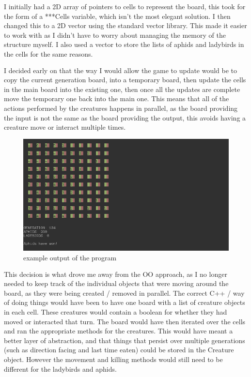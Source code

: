 \documentclass[10pt]{article}
\begin{document}
  I initially had a 2D array of pointers to cells to represent the board, this took for the form of a ***Cells variable, which isn't the most elegant solution. I then changed this to a 2D vector using the standard vector library. This made it easier to work with as I didn't have to worry about managing the memory of the structure myself. I also used a vector to store the lists of aphids and ladybirds in the cells for the same reasons. 

  I decided early on that the way I would allow the game to update would be to copy the current generation board, into a temporary board, then update the cells in the main board into the existing one, then once all the updates are complete move the temporary one back into the main one. This means that all of the actions performed by the creatures happens in parallel, as the board providing the input is not the same as the board providing the output, this avoids having a creature move or interact multiple times. 
  
  \begin{figure}[ht!]
  \centering
  \includegraphics[scale=0.5]{../images/output.png}
  \caption{example output of the program \label{overflow}}
  \end{figure}

  This decision is what drove me away from the OO approach, as I no longer needed to keep track of the individual objects that were moving around the board, as they were being created / removed in parallel. The correct C++ / way of doing things would have been to have one board with a list of creature objects in each cell. These creatures would contain a boolean for whether they had moved or interacted that turn. The board would have then iterated over the cells and ran the appropriate methods for the creatures. This would have meant a better layer of abstraction, and that things that persist over multiple generations (such as direction facing and last time eaten) could be stored in the Creature object. However the movement and killing methods would still need to be different for the ladybirds and aphids.
\end{document}
